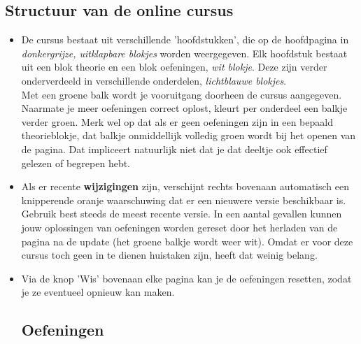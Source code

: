 \documentclass{ximera}
\begin{document}
 
 
\begin{onlineOnly}
\section*{Structuur van de online cursus}
 
\begin{itemize}
    \item De cursus bestaat uit verschillende 'hoofdstukken', die op de hoofdpagina in \textit{donkergrijze, uitklapbare blokjes} worden weergegeven. Elk hoofdstuk bestaat uit een blok theorie en een blok oefeningen, \textit{wit blokje}. Deze zijn verder onderverdeeld in verschillende onderdelen, \textit{lichtblauwe blokjes}.
    \\
    Met een groene balk wordt je vooruitgang doorheen de cursus aangegeven. Naarmate je meer oefeningen correct oplost, kleurt per onderdeel een balkje verder groen.
    Merk wel op dat als er geen oefeningen zijn in een bepaald theorieblokje, dat balkje onmiddellijk volledig groen wordt bij het openen van de pagina. Dat impliceert natuurlijk niet dat je dat deeltje ook effectief gelezen of begrepen hebt.
     
    \item Als er recente \textbf{wijzigingen} zijn, verschijnt rechts bovenaan automatisch een knipperende oranje waarschuwing dat er een nieuwere versie beschikbaar is. Gebruik best steeds de meest recente versie. In een aantal gevallen kunnen jouw oplossingen van oefeningen worden gereset door het herladen van de pagina na de update (het groene balkje wordt weer wit). Omdat er voor deze cursus toch geen in te dienen huistaken zijn, heeft dat weinig belang.
     
    \item Via de knop 'Wis' bovenaan elke pagina kan je de oefeningen resetten, zodat je ze eventueel opnieuw kan maken.
     
 
\section*{Oefeningen}

\end{itemize}
\end{onlineOnly}
\end{document}
